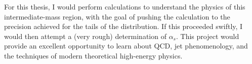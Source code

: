 \documentclass[11pt,twoside,reqno]{amsart}
\theoremstyle{plain}
\theoremstyle{remark}
\theoremstyle{definition}
\theoremstyle{remark}
\theoremstyle{definition}
\theoremstyle{definition}
\begin{document}
For this thesis, I would perform calculations to understand the physics of this intermediate-mass region, with the goal of pushing the calculation to the precision achieved for the tails of the distribution. If this proceeded swiftly, I would then attempt a (very rough) determination of $\alpha_s$. This project would provide an excellent opportunity to learn about QCD, jet phenomenology, and the techniques of modern theoretical high-energy physics.



\end{document}
